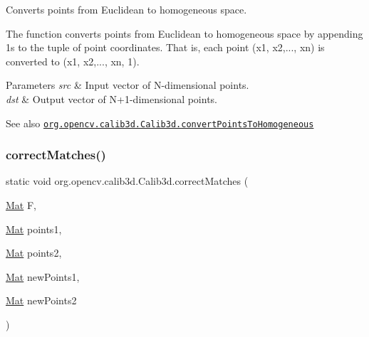 Converts points from Euclidean to homogeneous space.

The function converts points from Euclidean to homogeneous space by appending 1\textquotesingle{}s to the tuple of point coordinates. That is, each point {\ttfamily (x1, x2,..., xn)} is converted to {\ttfamily (x1, x2,..., xn, 1)}.


\begin{DoxyParams}{Parameters}
{\em src} & Input vector of {\ttfamily N}-\/dimensional points. \\
\hline
{\em dst} & Output vector of {\ttfamily N+1}-\/dimensional points.\\
\hline
\end{DoxyParams}
\begin{DoxySeeAlso}{See also}
\href{http://docs.opencv.org/modules/calib3d/doc/camera_calibration_and_3d_reconstruction.html#convertpointstohomogeneous}{\tt org.\+opencv.\+calib3d.\+Calib3d.\+convert\+Points\+To\+Homogeneous} 
\end{DoxySeeAlso}
\mbox{\label{classorg_1_1opencv_1_1calib3d_1_1_calib3d_a1f9be07026d6dec97548b38d2e46199e}} 
\subsubsection{\texorpdfstring{correct\+Matches()}{correctMatches()}}
{\footnotesize\ttfamily static void org.\+opencv.\+calib3d.\+Calib3d.\+correct\+Matches (\begin{DoxyParamCaption}\item[{\mbox{\hyperlink{classorg_1_1opencv_1_1core_1_1_mat}{Mat}}}]{F,  }\item[{\mbox{\hyperlink{classorg_1_1opencv_1_1core_1_1_mat}{Mat}}}]{points1,  }\item[{\mbox{\hyperlink{classorg_1_1opencv_1_1core_1_1_mat}{Mat}}}]{points2,  }\item[{\mbox{\hyperlink{classorg_1_1opencv_1_1core_1_1_mat}{Mat}}}]{new\+Points1,  }\item[{\mbox{\hyperlink{classorg_1_1opencv_1_1core_1_1_mat}{Mat}}}]{new\+Points2 }\end{DoxyParamCaption})\hspace{0.3cm}{\ttfamily [static]}}


